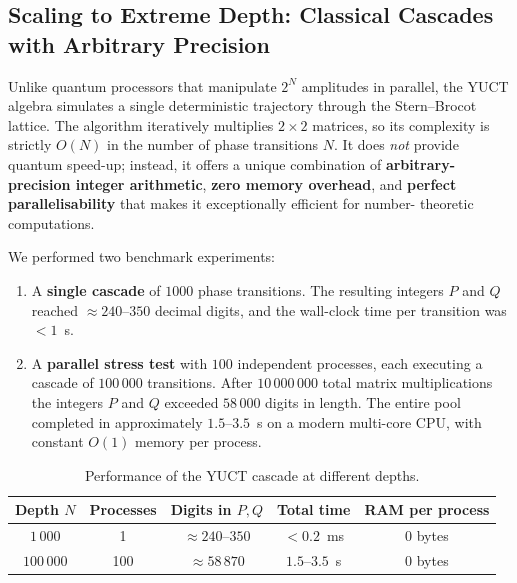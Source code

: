 \documentclass[12pt,a4paper]{article}
\begin{document}
	\subsection{Scaling to Extreme Depth: Classical Cascades with Arbitrary Precision}
	
	Unlike quantum processors that manipulate $2^N$ amplitudes in parallel,
	the YUCT algebra simulates a single deterministic trajectory through the
	Stern--Brocot lattice.  The algorithm iteratively multiplies $2\times2$
	matrices, so its complexity is strictly $O(N)$ in the number of phase
	transitions $N$.  It does \emph{not} provide quantum speed-up; instead,
	it offers a unique combination of \textbf{arbitrary-precision integer
		arithmetic}, \textbf{zero memory overhead}, and \textbf{perfect
		parallelisability} that makes it exceptionally efficient for number-
	theoretic computations.
	
	We performed two benchmark experiments:
	
	\begin{enumerate}[leftmargin=*]
		\item A \textbf{single cascade} of $1000$ phase transitions.  The
		resulting integers $P$ and $Q$ reached $\approx 240$--$350$ decimal
		digits, and the wall-clock time per transition was $<1$~\textmu s.
		\item A \textbf{parallel stress test} with $100$ independent processes,
		each executing a cascade of $100\,000$ transitions.  After
		$10\,000\,000$ total matrix multiplications the integers $P$ and $Q$
		exceeded $58\,000$ digits in length.  The entire pool completed in
		approximately $1.5$--$3.5$~s on a modern multi-core CPU, with
		constant $O(1)$ memory per process.
	\end{enumerate}
	
	\begin{table}[htbp]
		\centering
		\caption{Performance of the YUCT cascade at different depths.}
		\label{tab:cascade-bench}
		\begin{tabular}{c c c c c}
			\toprule
			Depth $N$ & Processes & Digits in $P,Q$ & Total time & RAM per process \\
			\midrule
			$1\,000$   & 1   & $\approx 240$--$350$ & $< 0.2$\ ms & 0 bytes \\
			$100\,000$ & 100 & $\approx 58\,870$     & $1.5$--$3.5$\ s & 0 bytes \\
			\bottomrule
		\end{tabular}
	\end{table}
	
\end{document}
